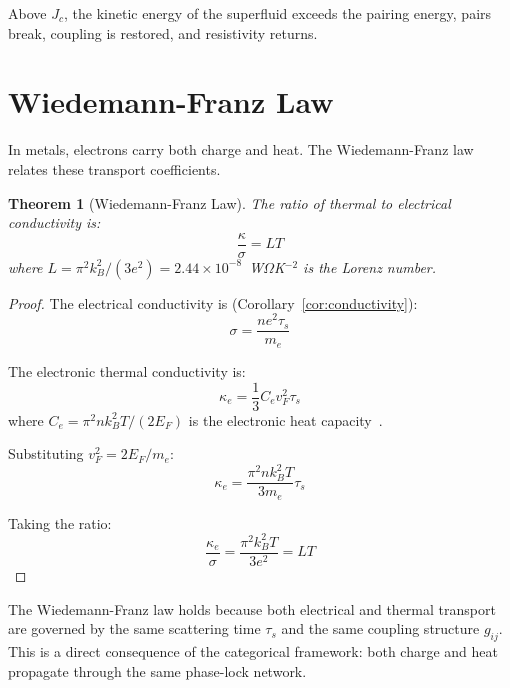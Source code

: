 \documentclass[twocolumn,showpacs,preprintnumbers,amsmath,amssymb,prd]{revtex4-2}
\newtheorem{theorem}{Theorem}[section]
\newcommand{\taus}{\tau_s}
\begin{document}
Above $J_c$, the kinetic energy of the superfluid exceeds the pairing energy, pairs break, coupling is restored, and resistivity returns.


\section{Wiedemann-Franz Law}
\label{sec:wiedemann_franz}

In metals, electrons carry both charge and heat. The Wiedemann-Franz law relates these transport coefficients.

\begin{theorem}[Wiedemann-Franz Law]
\label{thm:wiedemann_franz}
The ratio of thermal to electrical conductivity is:
\begin{equation}
\frac{\kappa}{\sigma} = LT
\label{eq:wiedemann_franz}
\end{equation}
where $L = \pi^2 k_B^2/(3e^2) = 2.44 \times 10^{-8}$~W$\Omega$K$^{-2}$ is the Lorenz number.
\end{theorem}

\begin{proof}
The electrical conductivity is (Corollary~\ref{cor:conductivity}):
\begin{equation}
\sigma = \frac{ne^2\taus}{m_e}
\end{equation}

The electronic thermal conductivity is:
\begin{equation}
\kappa_e = \frac{1}{3}C_e v_F^2 \taus
\end{equation}
where $C_e = \pi^2 nk_B^2 T/(2E_F)$ is the electronic heat capacity~\cite{Ashcroft1976}.

Substituting $v_F^2 = 2E_F/m_e$:
\begin{equation}
\kappa_e = \frac{\pi^2 nk_B^2 T}{3m_e}\taus
\end{equation}

Taking the ratio:
\begin{equation}
\frac{\kappa_e}{\sigma} = \frac{\pi^2 k_B^2 T}{3e^2} = LT
\end{equation}
\end{proof}

The Wiedemann-Franz law holds because both electrical and thermal transport are governed by the same scattering time $\taus$ and the same coupling structure $g_{ij}$. This is a direct consequence of the categorical framework: both charge and heat propagate through the same phase-lock network.
\end{document}
